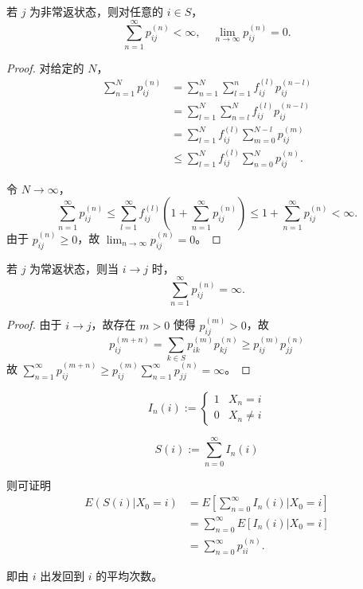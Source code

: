 \documentclass[lang=cn,10pt,thmcnt=section]{elegantbook}
\begin{document}
\begin{corollary}
	若 $j$ 为非常返状态，则对任意的 $i \in S$，
\[
\sum_{n=1}^{\infty} p_{ij}^{(n)} < \infty, \quad \lim_{n \to \infty} p_{ij}^{(n)} = 0.
\]
\end{corollary}
\begin{proof}
	对给定的 $N$，
\begin{align*}
\sum_{n=1}^{N} p_{ij}^{(n)} &= \sum_{n=1}^{N} \sum_{l=1}^{n} f_{ij}^{(l)} p_{ij}^{(n-l)} \\
&= \sum_{l=1}^{N} \sum_{n=l}^{N} f_{ij}^{(l)} p_{ij}^{(n-l)} \\
&= \sum_{l=1}^{N} f_{ij}^{(l)} \sum_{m=0}^{N-l} p_{ij}^{(m)} \\
&\leq \sum_{l=1}^{N} f_{ij}^{(l)} \sum_{n=0}^{N} p_{ij}^{(n)}.
\end{align*}

令 $N \to \infty$，
\[
\sum_{n=1}^{\infty} p_{ij}^{(n)} \leq \sum_{l=1}^{\infty} f_{ij}^{(l)} \left( 1 + \sum_{n=1}^{\infty} p_{ij}^{(n)} \right) \leq 1 + \sum_{n=1}^{\infty} p_{ij}^{(n)} < \infty.
\]
由于 $p_{ij}^{(n)} \geq 0$，故 $\lim_{n \to \infty} p_{ij}^{(n)} = 0$。

\end{proof}
\begin{corollary}
	若 $j$ 为常返状态，则当 $i \rightarrow j$ 时，
	\[
	\sum_{n=1}^{\infty} p_{ij}^{(n)} = \infty.
	\]
\end{corollary}
\begin{proof}
	由于 $i \rightarrow j$，故存在 $m > 0$ 使得 $p_{ij}^{(m)} > 0$，故
\[
p_{ij}^{(m+n)} = \sum_{k \in S} p_{ik}^{(m)} p_{kj}^{(n)} \geq p_{ij}^{(m)} p_{jj}^{(n)}
\]
故 $\sum_{n=1}^{\infty} p_{ij}^{(m+n)} \geq p_{ij}^{(m)} \sum_{n=1}^{\infty} p_{jj}^{(n)} = \infty$。
\end{proof}

\[
I_n(i) := 
\begin{cases} 
1 & X_n = i \\
0 & X_n \neq i 
\end{cases}
\]

\[
S(i) := \sum_{n=0}^{\infty} I_n(i)
\]

则可证明
\begin{align*}
E(S(i) | X_0 = i) &= E\left[\sum_{n=0}^{\infty} I_n(i) | X_0 = i\right] \\
&= \sum_{n=0}^{\infty} E[I_n(i) | X_0 = i] \\
&= \sum_{n=0}^{\infty} p_{ii}^{(n)}.
\end{align*}

即由 $i$ 出发回到 $i$ 的平均次数。
\end{document}
